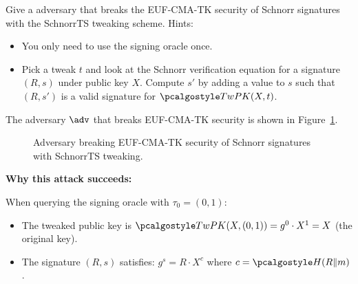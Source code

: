 \begin{exercise}
  Give a \ppt adversary that breaks the EUF-CMA-TK security of Schnorr signatures with the SchnorrTS tweaking scheme. Hints:
  \begin{itemize}
    \item You only need to use the signing oracle once.
    \item Pick a tweak $t$ and look at the Schnorr verification equation for a signature $(R, s)$ under public key $X$. Compute $s'$ by adding a value to $s$ such that $(R, s')$ is a valid signature for $\algo{TwPK}(X, t)$.
  \end{itemize}
\end{exercise}

\ifsolutions
\begin{mysolution}
  The adversary $\adv$ that breaks EUF-CMA-TK security is shown in Figure~\ref{fig:adversary-euf-cma-tk}.

  \begin{figure}[htb]
    \begin{center}
      \begin{tcolorbox}[width=7cm]
        \begin{pchstack}[center]
        \end{pchstack}
      \end{tcolorbox}
    \end{center}
    \caption{Adversary breaking EUF-CMA-TK security of Schnorr signatures with SchnorrTS tweaking.}
    \label{fig:adversary-euf-cma-tk}
  \end{figure}

  \textbf{Why this attack succeeds:}
  
  When querying the signing oracle with $\tau_0 = (0, 1)$:
  \begin{itemize}
    \item The tweaked public key is $\algo{TwPK}(X, (0, 1)) = g^0 \cdot X^1 = X$ (the original key).
    \item The signature $(R, s)$ satisfies: $g^s = R \cdot X^c$ where $c = \algo{H}(R \| m)$.
  \end{itemize}
  

\end{mysolution}
